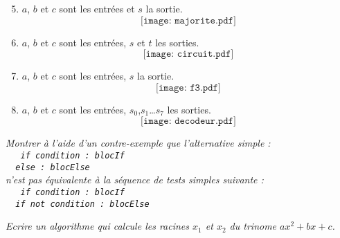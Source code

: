 \begin{td}
\hfill
\begin{minipage}[t]{7cm}
\begin{enumerate}\setcounter{enumi}{4}
\item $a$, $b$ et $c$ sont les entrées et $s$ la sortie.
	$$\texttt{[image: majorite.pdf]}$$
\item $a$, $b$ et $c$ sont les entrées, $s$ et $t$ les sorties.
	$$\texttt{[image: circuit.pdf]}$$
\end{enumerate}
\end{minipage}
\hfill
\begin{minipage}[t]{7cm}
\begin{enumerate}\setcounter{enumi}{6}
\item $a$, $b$ et $c$ sont les entrées, $s$ la sortie.
	$$\texttt{[image: f3.pdf]}$$
\end{enumerate}
\end{minipage}
\vspace*{3mm}

\begin{minipage}[t]{7cm}
\begin{enumerate}\setcounter{enumi}{7}
\item $a$, $b$ et $c$ sont les entrées, $s_0$,$s_1$\ldots $s_7$ les sorties.
	$$\texttt{[image: decodeur.pdf]}$$
\end{enumerate}
\end{minipage}
\end{td}

\begin{td}\label{td:reciproque}\em {}
Montrer à l'aide d'un contre-exemple que l'alternative simple :\\
{\tt
\mbox{}\ \ if condition : blocIf\\
\mbox{}\ \ else : blocElse
}\\
n'est pas équivalente à la séquence de tests simples suivante :\\
{\tt
\mbox{}\ \ if condition : blocIf\\
\mbox{}\ \ if not condition : blocElse
}
\end{td}

\begin{td}\label{td:trinome}\em {}
Ecrire un algorithme qui calcule les racines $x_1$ et $x_2$ du trinome $ax^2 + bx + c$.
\end{td}

